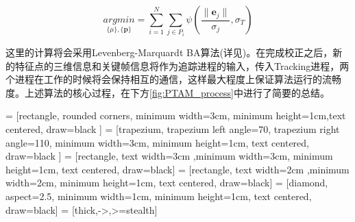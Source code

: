 \begin{equation}
\underset{\{\mu\},\{\mathbf{p}\}}{argmin} = \sum_{i=1}^{N} \sum_{j\in P_i} \psi(\frac{\lVert\mathbf{e}_j\rVert}{\sigma_j},\sigma_T)
\end{equation}

这里的计算将会采用Levenberg-Marquardt BA算法(详见\cite{Hartley2004})。在完成校正之后，新的特征点的三维信息和关键帧信息将作为追踪进程的输入，传入Tracking进程，两个进程在工作的时候将会保持相互的通信，这样最大程度上保证算法运行的流畅度。上述算法的核心过程，在下方\autoref{fig:PTAM_process}中进行了简要的总结。

\newpage
 = [rectangle, rounded corners, minimum width=3cm, minimum height=1cm,text centered, draw=black ] %
 = [trapezium, trapezium left angle=70, trapezium right angle=110, minimum width=3cm, minimum height=1cm, text centered, draw=black ]%
 = [rectangle, text width=3cm ,minimum width=3cm, minimum height=1cm, text centered, draw=black]%
 = [rectangle, text width=2cm ,minimum width=2cm, minimum height=1cm, text centered, draw=black]%
 = [diamond, aspect=2.5, minimum width=1cm, minimum height=1cm, text centered, draw=black]%
 = [thick,->,>=stealth]

